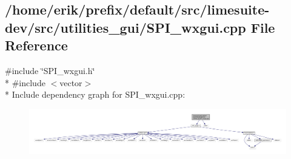 \subsection{/home/erik/prefix/default/src/limesuite-\/dev/src/utilities\+\_\+gui/\+S\+P\+I\+\_\+wxgui.cpp File Reference}
\label{SPI__wxgui_8cpp}
{\ttfamily \#include \char`\"{}S\+P\+I\+\_\+wxgui.\+h\char`\"{}}\\*
{\ttfamily \#include $<$vector$>$}\\*
Include dependency graph for S\+P\+I\+\_\+wxgui.\+cpp\+:
\nopagebreak
\begin{figure}[H]
\begin{center}
\leavevmode
\includegraphics[width=350pt]{dd/d2e/SPI__wxgui_8cpp__incl}
\end{center}
\end{figure}
